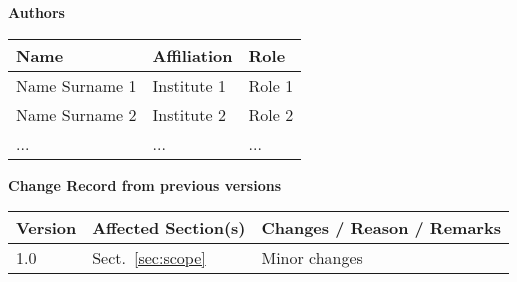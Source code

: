 \documentclass[12pt,a4paper]{article}
\begin{document}



\newpage
\pagestyle{fancy}

\noindent
{\Large \bf Authors}
\medskip

\noindent
\begin{tabularx}{\textwidth}{|l|X|X|}
  \hline
      \rowcolor{lightgray} {\bf Name} & {\bf Affiliation} & {\bf Role}\\
      \hline
      Name Surname 1     & Institute 1 & Role 1\\ \hline
      Name Surname 2     & Institute 2 & Role 2\\ \hline
      ...                & ...         & ...   \\ \hline
\end{tabularx}

\vspace{3cm}

\noindent
{\Large \bf Change Record from previous versions}
\medskip

\noindent
\begin{tabularx}{\textwidth}{|l|l|X|}
  \hline
      \rowcolor{lightgray} {\bf Version} & {\bf Affected Section(s)} & {\bf Changes / Reason / Remarks}\\  \hline
      1.0 & Sect.~\ref{sec:scope} &  Minor changes \\ \hline
\end{tabularx}


\newpage
\tableofcontents \thispagestyle{fancy}


\newpage





\newpage
\listofreq \thispagestyle{fancy}

\listofquestion \thispagestyle{fancy}


\label{LastPage}  %
\end{document}
